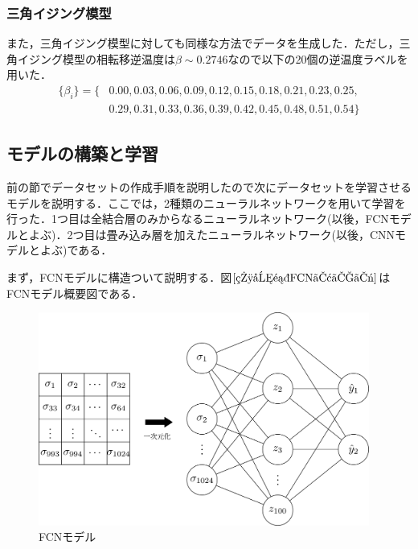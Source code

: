 \documentclass[a4paper,11pt]{jsreport}
\begin{document}
\subsubsection*{三角イジング模型}
また，三角イジング模型に対しても同様な方法でデータを生成した．ただし，三角イジング模型の相転移逆温度は$\beta \sim 0.2746$なので以下の20個の逆温度ラベルを用いた．
\begin{align*}
  \{\beta_i\} 
  = \{ &0.00,0.03,0.06,0.09,0.12,0.15,0.18,0.21,0.23,0.25,\\
  &0.29,0.31,0.33,0.36,0.39,0.42,0.45,0.48,0.51,0.54 \}
\end{align*}

\subsection{モデルの構築と学習}
前の節でデータセットの作成手順を説明したので次にデータセットを学習させるモデルを説明する．ここでは，2種類のニューラルネットワークを用いて学習を行った．1つ目は全結合層のみからなるニューラルネットワーク(以後，FCNモデルとよぶ)．2つ目は畳み込み層を加えたニューラルネットワーク(以後，CNNモデルとよぶ)である．\par
まず，FCNモデルに構造ついて説明する．図$\ref{相分類FCNモデル}$はFCNモデル概要図である．

\begin{figure}[H]
  \begin{center}
    \includegraphics[height=7cm]{image/相分類FCNモデル.png}
    \caption{FCNモデル}
    \label{相分類FCNモデル}
  \end{center}
\end{figure}
\end{document}
